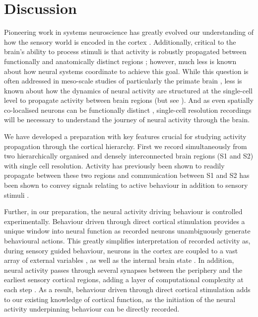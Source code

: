 \chapter{\label{discussion}Discussion}
Pioneering work in systems neuroscience has greatly evolved our understanding of how the sensory world is encoded in the cortex \cite{hubel_receptive_1962, okun_diverse_2015, stringer_high-dimensional_2019}. Additionally, critical to the brain’s ability to process stimuli is that activity is robustly propagated between functionally and anatomically distinct regions \cite{wernicke_aphasische_1874, felleman_distributed_1991, zylberberg_robust_2017}; however, much less is known about how neural systems coordinate to achieve this goal. While this question is often addressed in meso-scale studies of particularly the primate brain \cite{raichle_default_2001, van_den_heuvel_network_2013}, less is known about how the dynamics of neural activity are structured at the single-cell level to propagate activity between brain regions (but see \cite{reid_divergence_2001, semedo_cortical_2019, vugt_threshold_2018}). And as even spatially co-localised neurons can be functionally distinct \cite{runyan_response_2010, marmigere_specification_2007, kim_three_2015, velez-fort_stimulus_2014}, single-cell resolution recordings will be necessary to understand the journey of neural activity through the brain.

We have developed a preparation with key features crucial for studying activity propagation through the cortical hierarchy. First we record simultaneously from two hierarchically organised and densely interconnected brain regions (S1 and S2) with single cell resolution. Activity has previously been shown to readily propagate between these two regions \cite{pons_physiological_1987, alloway_homotypical_1985, kamatani_experience-dependent_2007, aronoff_long-range_2010} and communication between S1 and S2 has been shown to convey signals relating to active behaviour in addition to sensory stimuli \cite{kwon_sensory_2016, chen_behaviour-dependent_2013, chen_long-range_2016, yamashita_membrane_2013, yamashita_target-specific_2016}. 

Further, in our preparation, the neural activity driving behaviour is controlled experimentally. Behaviour driven through direct cortical stimulation provides a unique window into neural function as recorded neurons unambiguously generate behavioural actions. This greatly simplifies interpretation of recorded activity as, during sensory guided behaviour, neurons in the cortex are coupled to a vast array of external variables \cite{stringer_spontaneous_2019, musall_single-trial_2019}, as well as the internal brain state \cite{okun_diverse_2015, arieli_dynamics_1996}. In addition, neural activity passes through several synapses between the periphery and the earliest sensory cortical regions, adding a layer of computational complexity at each step \cite{mccormick_sensory_1994, sherman_thalamic_2005, king_superior_2004}. As a result, behaviour driven through direct cortical stimulation adds to our existing knowledge of cortical function, as the initiation of the neural activity underpinning behaviour can be directly recorded.

